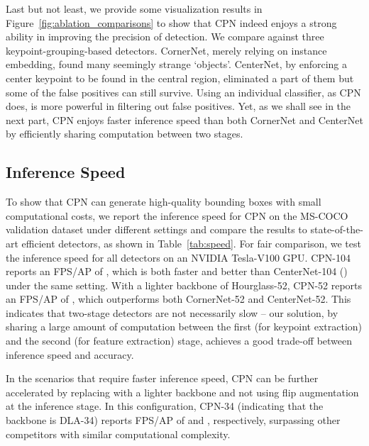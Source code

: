 \documentclass[runningheads]{llncs}
\begin{document}
Last but not least, we provide some visualization results in Figure~\ref{fig:ablation_comparisons} to show that CPN indeed enjoys a strong ability in improving the precision of detection. We compare against three keypoint-grouping-based detectors. CornerNet, merely relying on instance embedding, found many seemingly strange `objects'. CenterNet, by enforcing a center keypoint to be found in the central region, eliminated a part of them but some of the false positives can still survive. Using an individual classifier, as CPN does, is more powerful in filtering out false positives. Yet, as we shall see in the next part, CPN enjoys faster inference speed than both CornerNet and CenterNet by efficiently sharing computation between two stages.





\subsection{Inference Speed}
\label{Experiments:Speed}

To show that CPN can generate high-quality bounding boxes with small computational costs, we report the inference speed for CPN on the MS-COCO validation dataset under different settings and compare the results to state-of-the-art efficient detectors, as shown in Table~\ref{tab:speed}. For fair comparison, we test the inference speed for all detectors on an NVIDIA Tesla-V100 GPU. CPN-104 reports an FPS/AP of , which is both faster and better than CenterNet-104 () under the same setting. With a lighter backbone of Hourglass-52, CPN-52 reports an FPS/AP of , which outperforms both CornerNet-52 and CenterNet-52. This indicates that two-stage detectors are not necessarily slow -- our solution, by sharing a large amount of computation between the first (for keypoint extraction) and the second (for feature extraction) stage, achieves a good trade-off between inference speed and accuracy.

In the scenarios that require faster inference speed, CPN can be further accelerated by replacing with a lighter backbone and not using flip augmentation at the inference stage. In this configuration, CPN-34 (indicating that the backbone is DLA-34) reports FPS/AP of  and , respectively, surpassing other competitors with similar computational complexity.
\end{document}
